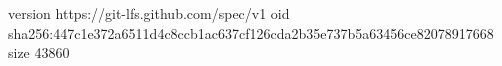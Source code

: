 version https://git-lfs.github.com/spec/v1
oid sha256:447c1e372a6511d4c8ccb1ac637cf126cda2b35e737b5a63456ce82078917668
size 43860
